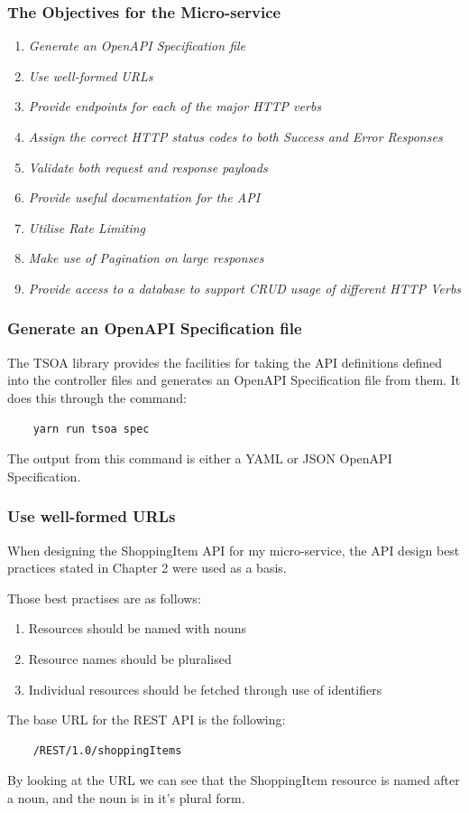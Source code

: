 \subsubsection{The Objectives for the Micro-service}
\begin{enumerate}
    \item \textit{Generate an OpenAPI Specification file}
    \item \textit{Use well-formed URLs}
    \item \textit{Provide endpoints for each of the major HTTP verbs}
    \item \textit{Assign the correct HTTP status codes to both Success and Error Responses}
    \item \textit{Validate both request and response payloads}
    \item \textit{Provide useful documentation for the API}
    \item \textit{Utilise Rate Limiting}
    \item \textit{Make use of Pagination on large responses}
    \item \textit{Provide access to a database to support CRUD usage of different HTTP Verbs}
\end{enumerate}
\subsubsection{Generate an OpenAPI Specification file}
The TSOA library provides the facilities for taking the API definitions defined into the controller files and generates an OpenAPI Specification file from them. It does this through the command:
\begin{verbatim}
    yarn run tsoa spec
\end{verbatim}
The output from this command is either a YAML or JSON OpenAPI Specification.
\subsubsection{Use well-formed URLs}
When designing the ShoppingItem API for my micro-service, the API design best practices stated in Chapter 2 were used as a basis.

Those best practises are as follows:
\begin{enumerate}
    \item Resources should be named with nouns
    \item Resource names should be pluralised
    \item Individual resources should be fetched through use of identifiers
\end{enumerate}
The base URL for the REST API is the following:
\begin{verbatim}
    /REST/1.0/shoppingItems
\end{verbatim}
By looking at the URL we can see that the ShoppingItem resource is named after a noun, and the noun is in it's plural form.

